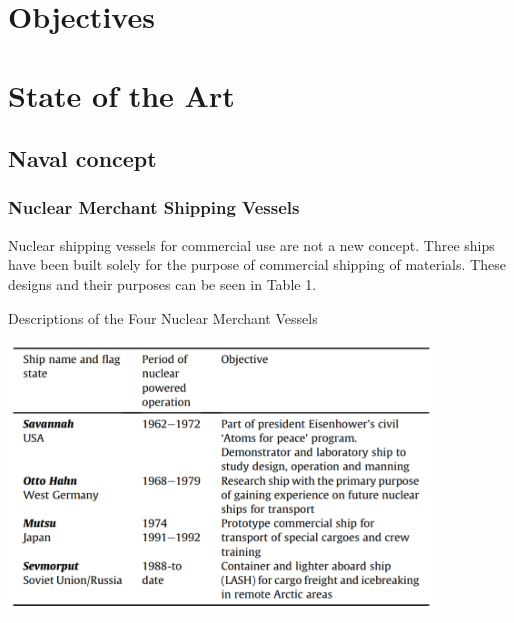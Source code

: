\documentclass[12pt]{article}
\begin{document}





\section{Objectives}
\section{State of the Art}
\subsection{Naval concept}
\subsubsection{Nuclear Merchant Shipping Vessels}
Nuclear shipping vessels for commercial use are not a new concept.  Three ships have been built solely for the purpose of commercial shipping of materials.  These designs and their purposes can be seen in Table 1.

\begin{table}[H]
\begin{center}
\caption{Descriptions of the Four Nuclear Merchant Vessels \cite{historic_ships}}
\label{t:KLT-40S2}  %
\includegraphics[width=0.85\textwidth]{four_ships} %
\end{center}
\end{table}
\end{document}
